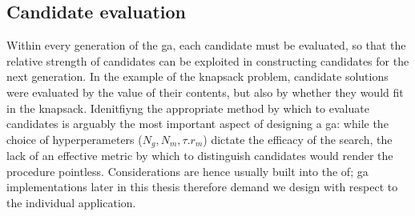 \subsection{Candidate evaluation}
\label{sec:candidate_evaluation}
Within every generation of the \gls{ga}, each candidate must be evaluated, 
    so that the relative strength of candidates can be exploited in constructing 
    candidates for the next generation.
In the example of the knapsack problem, candidate solutions were evaluated by the value of their contents, 
    but also by whether they would fit in the knapsack. 
Idenitfiyng the appropriate method by which to evaluate candidates is arguably the most important aspect of designing a \gls{ga}:
    while the choice of hyperperameters ($N_g, N_m, \tau. r_m$) dictate the efficacy of the search, 
    the lack of an effective metric by which to distinguish candidates would render the procedure pointless.
Considerations are hence usually built into the \acrlong{of};
    \gls{ga} implementations later in this thesis therefore demand we design  
    with respect to the individual application. 
\par 




